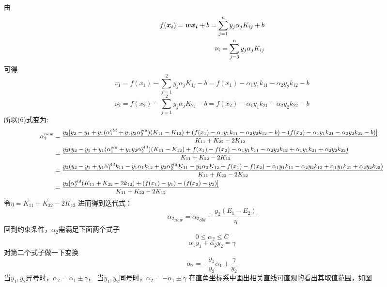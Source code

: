 \documentclass[UTF8]{ctexart}
\begin{document}
由
\begin{equation}\notag
    \begin{aligned}
        f(\boldsymbol{x_i})=\boldsymbol w \boldsymbol{x_i} + b=\sum_{j=1}^n y_j\alpha_j K_{ij} +b \\
        \nu_i=\sum_{j=3}^n y_j \alpha_j K_{ij}
    \end{aligned}
\end{equation}
可得
$$\nu_1=f(x_1)-\sum_{j=1}^2 y_j\alpha_j K_{1j} -b = f(x_1)-\alpha_1y_1k_{11}-\alpha_2y_2k_{12}-b$$
$$\nu_2=f(x_2)-\sum_{j=1}^2 y_j\alpha_j K_{2j} -b = f(x_2)-\alpha_1y_1k_{21}-\alpha_2y_2k_{22}-b$$
所以(6)式变为:
\begin{equation}\notag \small
    \begin{aligned}
        \alpha_2^{new} &=\frac{y_2[y_2-y_1+y_1(\alpha_1^{old} + y_1y_2\alpha_2^{old})(K_{11}-K_{12}) + (f(x_1)-\alpha_1y_1k_{11}-\alpha_2y_2k_{12}-b) -(f(x_2)-\alpha_1y_1k_{21}-\alpha_2y_2k_{22}-b)]}{K_{11}+K_{22}-2K_{12}}\\
        &=\frac{y_2(y_2-y_1+y_1(\alpha_1^{old} + y_1y_2\alpha_2^{old})(K_{11}-K_{12}) + f(x_1)-f(x_2)-\alpha_1y_1k_{11}-\alpha_2y_2k_{12}+\alpha_1y_1k_{21}+\alpha_2y_2k_{22} )}{K_{11}+K_{22}-2K_{12}}\\
        &=\frac{y_2(y_2-y_1+y_1\alpha_1^{old}k_{11}-y_1\alpha_1k_{12} + y_2\alpha_2^{old}K_{11}-y_2\alpha_2K_{12} + f(x_1)-f(x_2)-\alpha_1y_1k_{11}-\alpha_2y_2k_{12}+\alpha_1y_1k_{21}+\alpha_2y_2k_{22} )}{K_{11}+K_{22}-2K_{12}}\\
        &=\frac{y_2[\alpha_2^{old}(K_{11}+K_{22}-2k_{12}) + (f(x_1)-y_1)-(f(x_2)-y_2)]}{K_{11}+K_{22}-2K_{12}}
    \end{aligned}
\end{equation}
令$\eta=K_{11}+K_{22}-2K_{12}$
进而得到迭代式：
\begin{equation}
    {\alpha_2}_{new}={\alpha_2}_{old}+\frac{y_2(E_1-E_2)}{\eta}
\end{equation}
回到约束条件，$\alpha_2$需满足下面两个式子
$$0 \leqslant \alpha_2 \leqslant C$$
$$ \alpha_1y_1 + \alpha_2y_2 = \gamma  $$
对第二个式子做一下变换
$$\alpha_2=-\frac{y_1}{y_2}\alpha_1+\frac{\gamma}{y_2}$$
当$y_1,y_2$异号时，$\alpha_2=\alpha_1 \pm \gamma$，
当$y_1,y_2$同号时，$\alpha_2=-\alpha_1 \pm \gamma$
在直角坐标系中画出相关直线可直观的看出其取值范围，如图
\end{document}
